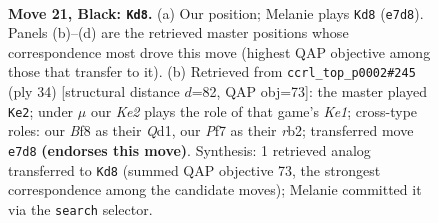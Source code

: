 \documentclass[11pt]{article}
\begin{document}
\clearpage

\begin{figure}[p]\centering
\begin{subfigure}{0.46\textwidth}\centering
\resizebox{\linewidth}{!}{%
\newchessgame
\chessboard[
  setfen={r1q2b1r/p3kpp1/3P1n1p/4nP1P/B7/6p1/8/R1BQK1NR b KQ - 0 21},
  showmover=false,
  pgfstyle=straightmove, color=movearrow, markmove={e7-d8}
]}
\caption{}
\end{subfigure}\hfill
\begin{subfigure}{0.46\textwidth}\centering
\resizebox{\linewidth}{!}{%
\newchessgame
\chessboard[
  setfen={2bqk2r/5ppp/p2p4/3Np3/R2PP3/N7/1r1b1PPP/3QKB1R w Kk - 1 18},
  showmover=false,
  pgfstyle=straightmove, color=movearrow, markmove={e1-e2}
]}
\caption{}
\end{subfigure}
\\[4pt]

\caption{\textbf{Move 21, Black: \texttt{Kd8}.} (a) Our position; Melanie plays \texttt{Kd8} (\texttt{e7d8}). Panels (b)--(d) are the retrieved master positions whose correspondence most drove this move (highest QAP objective among those that transfer to it). (b) Retrieved from \texttt{ccrl\_top\_p0002\#245} (ply 34) [structural distance $d$=82, QAP obj=73]: the master played \texttt{Ke2}; under $\mu$ our \emph{Ke2} plays the role of that game's \emph{Ke1}; cross-type roles: our \emph{B}f8 as their \emph{Q}d1, our \emph{P}f7 as their \emph{r}b2; transferred move \texttt{e7d8} \textbf{(endorses this move)}. Synthesis: 1 retrieved analog transferred to \texttt{Kd8} (summed QAP objective 73, the strongest correspondence among the candidate moves); Melanie committed it via the \texttt{search} selector.}
\label{fig:thought-m41}
\end{figure}

\clearpage
\end{document}
